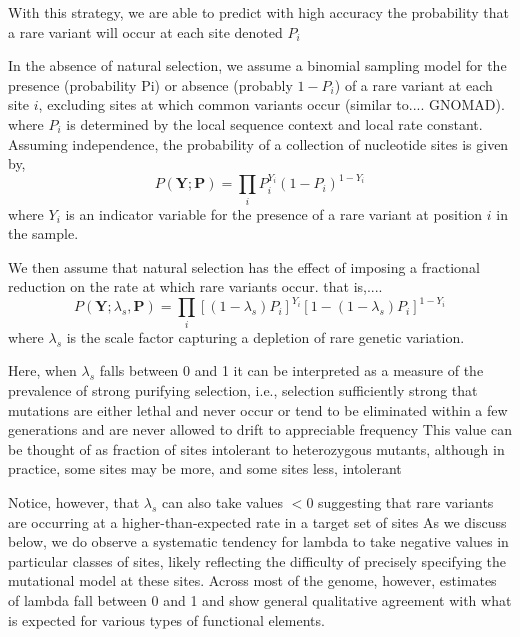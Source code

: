 \documentclass[11pt]{article}
\newcommand{\mathbb}[1]{\boldsymbol{\mathbf{#1}}}
\begin{document}
With this strategy,
we are able to predict with high accuracy the probability that a rare variant will occur at each site
denoted $P_i$


In the absence of natural selection, we assume a  binomial sampling model for the presence (probability Pi) or absence (probably $1-P_i$) of a rare variant at each site $i$, excluding sites at which common variants occur (similar to.... GNOMAD).
where $P_i$ is determined by the local sequence context and local rate constant.  Assuming independence, the probability of a collection of nucleotide sites is given by,
\begin{equation}
P(\mathbb{Y}; \mathbb{P}) = \prod_i P_i^{Y_i}(1-P_i)^{1-Y_i}
\end{equation}
\noindent where $Y_i$ is an indicator variable for the presence of a rare variant at position $i$ in the sample.

We then assume that natural selection has the effect of imposing a fractional reduction on the rate at which rare variants occur.  that is,....
\begin{equation}
  P(\mathbb{Y}; \lambda_s, \mathbb{P}) = \prod_i \left[(1-\lambda_s) P_i\right]^{Y_i}\left[1- (1-\lambda_s) P_i\right]^{1-Y_i}
\end{equation}
\noindent where $\lambda_s$ is the scale factor capturing a depletion of rare genetic variation.

Here, when $\lambda_s$ falls between 0 and 1 it can be interpreted as a measure of the prevalence of strong purifying selection,
i.e., selection sufficiently strong that mutations are either lethal and never occur or tend to be eliminated within a few generations and are never allowed to drift to appreciable frequency
This value can be thought of as fraction of sites intolerant to heterozygous mutants, although in practice, some sites may be more, and some sites less, intolerant

Notice, however, that $\lambda_s$ can also take values $<0$
suggesting that rare variants are occurring at a higher-than-expected rate in a target set of sites
As we discuss below, we do observe a systematic tendency for lambda to take negative values in particular classes of sites, likely reflecting the difficulty of precisely specifying the mutational model at these sites.
Across most of the genome, however, estimates of lambda fall between 0 and 1 and show general qualitative agreement with what is expected for various types of functional elements.
\end{document}
